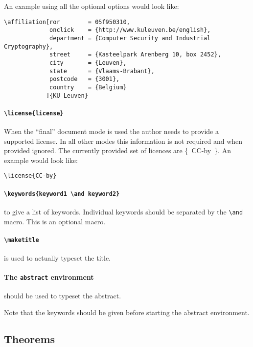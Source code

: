 \documentclass{iacrcc}
\begin{document}
\noindent An example using all the optional options would look like:

\begin{verbatim}
\affiliation[ror        = 05f950310,
             onclick    = {http://www.kuleuven.be/english},
             department = {Computer Security and Industrial Cryptography},              
             street     = {Kasteelpark Arenberg 10, box 2452},
             city       = {Leuven},
             state      = {Vlaams-Brabant},
             postcode   = {3001},
             country    = {Belgium}
            ]{KU Leuven}
\end{verbatim}           

\paragraph{\texttt{\textbackslash license\{license\}}}
When the ``final'' document mode is used the author needs to provide a supported license.
In all other modes this information is not required and when provided ignored.
The currently provided set of licences are \mbox{\{ CC-by \}}.
An example would look like:

\begin{verbatim}
\license{CC-by}
\end{verbatim}

\paragraph{\texttt{\textbackslash keywords\{keyword1 \textbackslash{}and keyword2\}}} to give a list of
keywords.
Individual keywords should be separated by the \verb+\and+ macro.
This is an optional macro.

\paragraph{\texttt{\textbackslash maketitle}} is used to actually
typeset the title.

\paragraph{The \texttt{abstract} environment} should be used to typeset the abstract.

Note that the keywords should be given before starting the abstract environment.

\subsection{Theorems}
\end{document}
